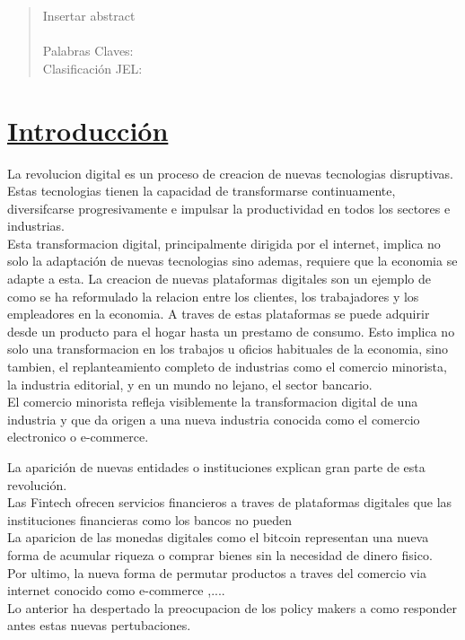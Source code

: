 \documentclass[12pt,a4paper,pdflatex]{article}
\begin{document}

\thispagestyle{empty}
\newpage
\begin{abstract}
Insertar abstract\\
\\
Palabras Claves:\\
Clasificación JEL:
\end{abstract}
\thispagestyle{empty}
\newpage


\tableofcontents
\thispagestyle{empty}
\newpage
\listoffigures
\thispagestyle{empty}
\newpage
\listoftables
\thispagestyle{empty}

\newpage


\section{\underline{Introducción}}\label{sec1}
\pagestyle{fancy}
\fancyhf{}
\fancyhead[R]{\thepage}

\doublespacing

La revolucion digital es un proceso de creacion de nuevas tecnologias disruptivas. Estas tecnologias tienen la capacidad de transformarse continuamente, diversifcarse progresivamente e impulsar la productividad en todos los sectores e industrias.\\
Esta transformacion digital, principalmente dirigida por el internet, implica no solo la adaptación de nuevas tecnologias sino ademas, requiere que la economia se adapte a esta. La creacion de nuevas plataformas digitales son un ejemplo de como se ha reformulado la relacion entre los clientes, los trabajadores y los empleadores en la economia. A traves de estas plataformas se puede adquirir desde un producto para el hogar hasta un prestamo de consumo. Esto implica no solo una transformacion en los trabajos u oficios habituales de la economia, sino tambien, el replanteamiento completo de industrias como el comercio minorista, la industria editorial, y en un mundo no lejano, el sector bancario. \\
El comercio minorista refleja visiblemente la transformacion digital de una industria y que da origen a una nueva industria conocida como el comercio electronico o e-commerce.



La aparición de nuevas entidades o instituciones explican gran parte de esta revolución. \\
Las Fintech ofrecen servicios financieros a traves de plataformas digitales que las instituciones financieras como los bancos no pueden \\
La aparicion de las monedas digitales como el bitcoin representan una nueva forma de acumular riqueza o comprar bienes sin la necesidad de dinero fisico. \\
Por ultimo, la nueva forma de permutar productos a traves del comercio via internet conocido como e-commerce ,.... \\
Lo anterior ha despertado la preocupacion de los policy makers a como responder antes estas nuevas pertubaciones.
\end{document}
